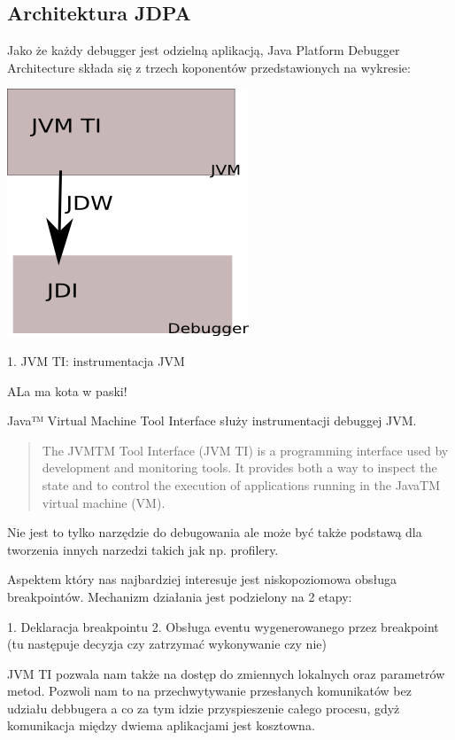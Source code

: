 \subsection{Architektura JDPA}

Jako że każdy debugger jest odzielną aplikacją, Java Platform Debugger Architecture składa się z trzech koponentów przedstawionych na wykresie:

\includegraphics{imgs/jdpa}

1. JVM TI: instrumentacja JVM

ALa ma kota w paski!

Java™ Virtual Machine Tool Interface służy instrumentacji debuggej JVM.

\begin{quote}
The JVMTM Tool Interface (JVM TI) is a programming interface used by development and monitoring tools. It provides both a way to inspect the state and to control the execution of applications running in the JavaTM virtual machine (VM). \cite{jvmtiSpec}
\end{quote}

Nie jest to tylko narzędzie do debugowania ale może być także podstawą dla tworzenia innych narzedzi takich jak np. profilery.

Aspektem który nas najbardziej interesuje jest niskopoziomowa obsługa breakpointów. Mechanizm działania jest podzielony na 2 etapy:

1. Deklaracja breakpointu
2. Obsługa eventu wygenerowanego przez breakpoint (tu następuje decyzja czy zatrzymać wykonywanie czy nie)

JVM TI pozwala nam także na dostęp do zmiennych lokalnych oraz parametrów metod. Pozwoli nam to na przechwytywanie przesłanych komunikatów bez udziału debbugera a co za tym idzie przyspieszenie całego procesu, gdyż komunikacja między dwiema aplikacjami jest kosztowna.


